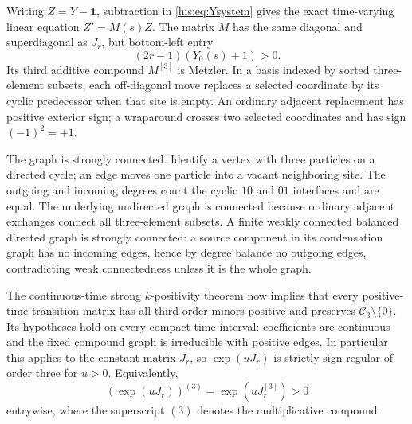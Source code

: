 Writing $Z=Y-\mathbf1$, subtraction in \eqref{his:eq:Ysystem} gives the exact time-varying linear equation $Z'=M(s)Z$. The matrix $M$ has the same diagonal and superdiagonal as $J_r$, but bottom-left entry
\begin{equation}\label{his:eq:corner}
 (2r-1)(Y_0(s)+1)>0.
\end{equation}
Its third additive compound $M^{[3]}$ is Metzler. In a basis indexed by sorted three-element subsets, each off-diagonal move replaces a selected coordinate by its cyclic predecessor when that site is empty. An ordinary adjacent replacement has positive exterior sign; a wraparound crosses two selected coordinates and has sign $(-1)^2=+1$.

The graph is strongly connected. Identify a vertex with three particles on a directed cycle; an edge moves one particle into a vacant neighboring site. The outgoing and incoming degrees count the cyclic $10$ and $01$ interfaces and are equal. The underlying undirected graph is connected because ordinary adjacent exchanges connect all three-element subsets. A finite weakly connected balanced directed graph is strongly connected: a source component in its condensation graph has no incoming edges, hence by degree balance no outgoing edges, contradicting weak connectedness unless it is the whole graph.

The continuous-time strong $k$-positivity theorem \cite[Theorems~4--5]{weiss2021} now implies that every positive-time transition matrix has all third-order minors positive and preserves $\mathcal C_3\setminus\{0\}$. Its hypotheses hold on every compact time interval: coefficients are continuous and the fixed compound graph is irreducible with positive edges. In particular this applies to the constant matrix $J_r$, so $\exp(uJ_r)$ is strictly sign-regular of order three for $u>0$. Equivalently,
\[
 (\exp(uJ_r))^{(3)}=\exp(uJ_r^{[3]})>0
\]
entrywise, where the superscript $(3)$ denotes the multiplicative compound.

